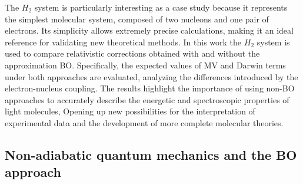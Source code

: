 \documentclass[%
 reprint,
 amsmath,amssymb,
 aps,
]{revtex4-2}
\begin{document}
The $H_2$ system is particularly interesting as a case study because it represents the simplest molecular system, composed of two nucleons and one pair of electrons. Its simplicity allows extremely precise calculations, making it an ideal reference for validating new theoretical methods. In this work the $H_2$ system is used to compare relativistic corrections obtained with and without the approximation BO. Specifically, the expected values of MV and Darwin terms under both approaches are evaluated, analyzing the differences introduced by the electron-nucleus coupling. The results highlight the importance of using non-BO approaches to accurately describe the energetic and spectroscopic properties of light molecules, Opening up new possibilities for the interpretation of experimental data and the development of more complete molecular theories.

\subsection{\label{sec:level2}Non-adiabatic quantum mechanics and the BO approach}


\end{document}

